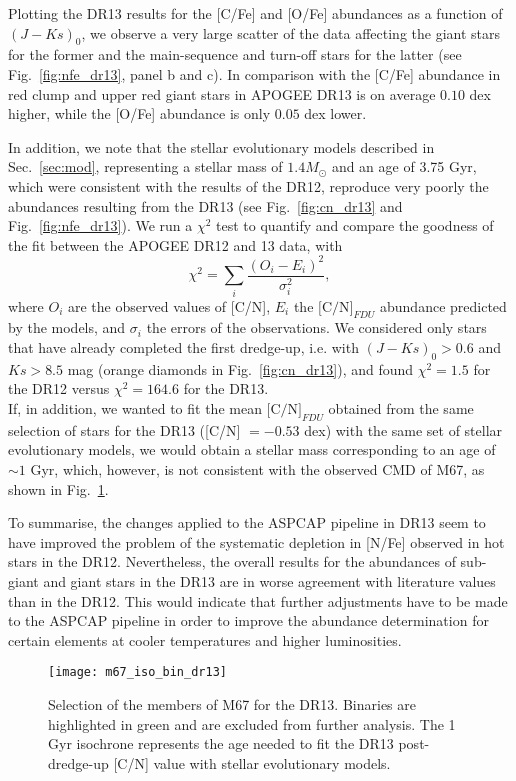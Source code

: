 \documentclass[a4paper,fleqn,usenatbib]{mnras}
\begin{document}
Plotting the DR13 results for the [C/Fe] and [O/Fe] abundances as a function of $(J-Ks)_0$, we observe a very large scatter of the data affecting the giant stars for the former and the main-sequence and turn-off stars for the latter (see Fig.~\ref{fig:nfe_dr13}, panel b and c). In comparison with \citet{tautv2000} the [C/Fe] abundance in red clump and upper red giant stars in APOGEE DR13 is on average $0.10$ dex higher, while the [O/Fe] abundance is only $0.05$ dex lower.

In addition, we note that the stellar evolutionary models described in Sec.~\ref{sec:mod}, representing a stellar mass of $1.4 M_{\odot}$ and an age of 3.75 Gyr, which were consistent with the results of the DR12, reproduce very poorly the abundances resulting from the DR13 (see Fig.~\ref{fig:cn_dr13} and Fig.~\ref{fig:nfe_dr13}).
We run a $\chi^2$ test to quantify and compare the goodness of the fit between the APOGEE DR12 and 13 data, with
\begin{equation}
\chi^2=\sum_{i} \dfrac{(O_i-E_i)^2}{\sigma_i^2},
\end{equation}
where $O_i$ are the observed values of [C/N], $E_i$ the $\text{[C/N]}_{FDU}$ abundance predicted by the models, and $\sigma_i$ the errors of the observations. We considered only stars that have already completed the first dredge-up, i.e. with $(J-Ks)_0>0.6$ and $Ks>8.5$ mag (orange diamonds in Fig.~\ref{fig:cn_dr13}), and found $\chi^2=1.5$ for the DR12 versus $\chi^2=164.6$ for the DR13.\\
If, in addition, we wanted to fit the mean $\text{[C/N]}_{FDU}$ obtained from the same selection of stars for the DR13 ([C/N] $=-0.53$ dex) with the same set of stellar evolutionary models, we would obtain a stellar mass corresponding to an age of $\sim 1$ Gyr, which, however, is not consistent with the observed CMD of M67, as shown in Fig.~\ref{fig:iso_bin_dr13}.

To summarise, the changes applied to the ASPCAP pipeline in DR13 seem to have improved the problem of the systematic depletion in [N/Fe] observed in hot stars in the DR12. Nevertheless, the overall results for the abundances of sub-giant and giant stars in the DR13 are in worse agreement with literature values than in the DR12. This would indicate that further adjustments have to be made to the ASPCAP pipeline in order to improve the abundance determination for certain elements at cooler temperatures and higher luminosities.



\begin{figure}
	\texttt{[image: m67\_iso\_bin\_dr13]}
	\caption{Selection of the members of M67 for the DR13. Binaries are highlighted in green and are excluded from further analysis. The 1 Gyr isochrone represents the age needed to fit the DR13 post-dredge-up [C/N] value with stellar evolutionary models.}
	\label{fig:iso_bin_dr13}
\end{figure}
\end{document}
